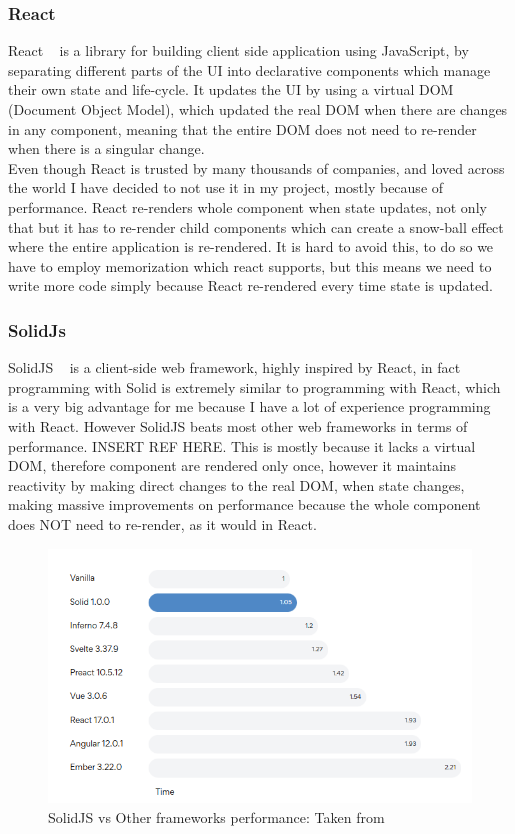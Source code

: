 \documentclass[titlepage]{article}
\begin{document}
\subsubsection{React}
React ~\cite{react} is a library for building client side application using JavaScript, by separating different parts of the UI into declarative components which manage their own state and life-cycle. It updates the UI by using a virtual DOM (Document Object Model), which updated the real DOM when there are changes in any component, meaning that the entire DOM does not need to re-render when there is a singular change. \\

Even though React is trusted by many thousands of companies, and loved across the world I have decided to not use it in my project, mostly because of performance. React re-renders whole component when state updates, not only that but it has to re-render child components which can create a snow-ball effect where the entire application is re-rendered. It is hard to avoid this, to do so we have to employ memorization which react supports, but this means we need to write more code simply because React re-rendered every time state is updated. \\

\subsubsection{SolidJs}
SolidJS ~\cite{solid} is a client-side web framework, highly inspired by React, in fact programming with Solid is extremely similar to programming with React, which is a very big advantage for me because I have a lot of experience programming with React. However SolidJS beats most other web frameworks in terms of performance. INSERT REF HERE. This is mostly because it lacks a virtual DOM, therefore component are rendered only once, however it maintains reactivity by making direct changes to the real DOM, when state changes, making massive improvements on performance because the whole component does NOT need to re-render, as it would in React. \\


\begin{figure}
  \caption{SolidJS vs Other frameworks performance: Taken from ~\cite{solid}}
\centering
\includegraphics[width=1\textwidth]{solidjs_perf.png}
\end{figure}
\end{document}
